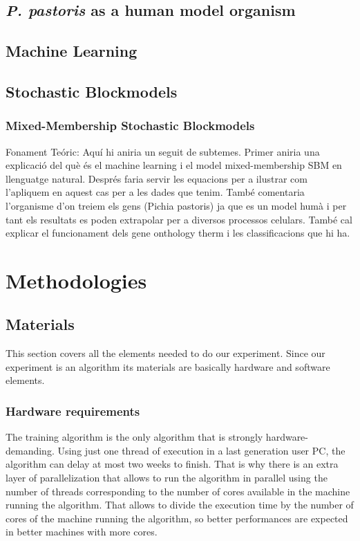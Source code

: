 \documentclass[11pt]{article}
\begin{document}
  
  \subsection{\textit{P. pastoris} as a human model organism}

  \subsection{Machine Learning}
  
  \subsection{Stochastic Blockmodels}
  
    \subsubsection{Mixed-Membership Stochastic Blockmodels}
    
  
  
  
Fonament Teóric: Aquí hi aniria un seguit de subtemes. Primer aniria una explicació del què és el machine learning i el model mixed-membership SBM en llenguatge natural. Després faria servir les equacions per a ilustrar com l'apliquem en aquest cas per a les dades que tenim.  També comentaria l'organisme d'on treiem els gens (Pichia pastoris) ja que es un model humà i per tant els resultats es poden extrapolar per a diversos processos celulars. També cal explicar el funcionament dels gene onthology therm i les classificacions que hi ha.

\section{Methodologies}

  \subsection{Materials}
  This section covers all the elements needed to do our experiment. Since our experiment is an algorithm its materials are basically hardware and software elements.
    \subsubsection{Hardware requirements}
    The training algorithm is the only algorithm that is strongly hardware-demanding. Using just one thread of execution in a last generation user PC, the algorithm can delay at most two weeks to finish. That is why there is an extra layer of parallelization that allows to run the algorithm in parallel using the number of threads corresponding to the number of cores available in the machine running the algorithm. That allows to divide the execution time by the number of cores of the machine running the algorithm, so better performances are expected in better machines with more cores.
\end{document}
